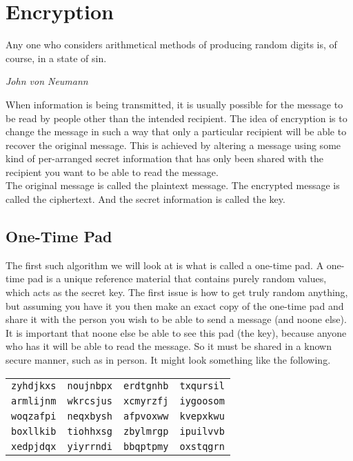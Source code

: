 \chapter{Encryption}

\epigraph{Any one who considers arithmetical methods of producing random digits is, of course, in a state of sin.}{\textit{John von Neumann}}


When information is being transmitted, it is usually possible for the message to be read by people other than the intended recipient. The idea of encryption is to change the message in such a way that only a particular recipient will be able to recover the original message. This is achieved by altering a message using some kind of per-arranged secret information that has only been shared with the recipient you want to be able to read the message.\\

The original message is called the plaintext message. The encrypted message is called the ciphertext. And the secret information is called the key.\\

\section{One-Time Pad}

The first such algorithm we will look at is what is called a one-time pad. A one-time pad is a unique reference material that contains purely random values, which acts as the secret key. The first issue is how to get truly random anything, but assuming you have it you then make an exact copy of the one-time pad and share it with the person you wish to be able to send a message (and noone else). It is important that noone else be able to see this pad (the key), because anyone who has it will be able to read the message. So it must be shared in a known secure manner, such as in person. It might look something like the following.\\

\begin{center}
	\begin{tabular}{c | c | c | c }
		 \texttt{zyhdjkxs} & \texttt{noujnbpx} & \texttt{erdtgnhb} & \texttt{txqursil}\\
		 \texttt{armlijnm} & \texttt{wkrcsjus} & \texttt{xcmyrzfj} & \texttt{iygoosom}\\
		 \texttt{woqzafpi} & \texttt{neqxbysh} & \texttt{afpvoxww} & \texttt{kvepxkwu}\\
		 \texttt{boxllkib} & \texttt{tiohhxsg} & \texttt{zbylmrgp} & \texttt{ipuilvvb}\\
		 \texttt{xedpjdqx} & \texttt{yiyrrndi} & \texttt{bbqptpmy} & \texttt{oxstqgrn}\\
	\end{tabular}
\end{center}


